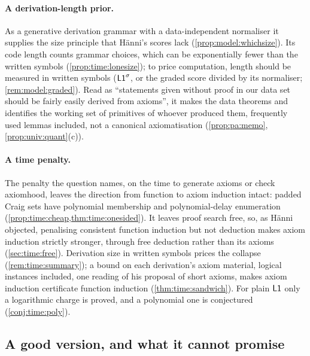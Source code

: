 \paragraph{A derivation-length prior.} As a generative derivation grammar with a data-independent normaliser it supplies the size principle that H\"anni's scores lack (\cref{prop:model:whichsize}). Its code length counts grammar choices, which can be exponentially fewer than the written symbols (\cref{prop:time:lonesize}); to price computation, length should be measured in written symbols ($\mathord{\mathsf{L1}}^{\sigma}$, or the graded score divided by its normaliser; \cref{rem:model:graded}). Read as ``statements given without proof in our data set should be fairly easily derived from axioms'', it makes the data theorems and identifies the working set of primitives of whoever produced them, frequently used lemmas included, not a canonical axiomatisation (\cref{prop:pa:memo}, \cref{prop:univ:quant}(c)).

\paragraph{A time penalty.} The penalty the question names, on the time to generate axioms or check axiomhood, leaves the direction from function to axiom induction intact: padded Craig sets have polynomial membership and polynomial-delay enumeration (\cref{prop:time:cheap,thm:time:onesided}). It leaves proof search free, so, as H\"anni objected, penalising consistent function induction but not deduction makes axiom induction strictly stronger, through free deduction rather than its axioms (\cref{sec:time:free}). Derivation size in written symbols prices the collapse (\cref{rem:time:summary}); a bound on each derivation's axiom material, logical instances included, one reading of his proposal of short axioms, makes axiom induction certificate function induction (\cref{thm:time:sandwich}). For plain $\mathord{\mathsf{L1}}$ only a logarithmic charge is proved, and a polynomial one is conjectured (\cref{conj:time:poly}).

\subsection{A good version, and what it cannot promise}\label{sec:disc:good}


